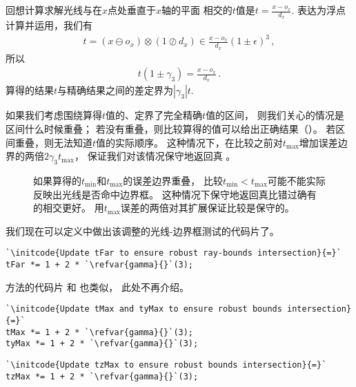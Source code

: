 回想计算求解光线与在$x$点处垂直于$x$轴的平面
相交的$t$值是$\displaystyle t=\frac{x-o_x}{d_x}$.
表达为浮点计算并运用，我们有
\begin{align*}
    t=(x\ominus o_x)\otimes(1\oslash d_x)\in\frac{x-o_x}{d_x}(1\pm\epsilon)^3\, ,
\end{align*}
所以
\begin{align*}
    t(1\pm\gamma_3)=\frac{x-o_x}{d_x}\, .
\end{align*}
算得的结果$t$与精确结果之间的差定界为$|\gamma_3|t$.

如果我们考虑围绕算得$t$值的、定界了完全精确$t$值的区间，
则我们关心的情况是区间什么时候重叠；
若没有重叠，则比较算得的值可以给出正确结果（）。
若区间重叠，则无法知道$t$值的实际顺序。
这种情况下，在比较之前对$t_{\max}$增加误差边界的两倍$2\gamma_3t_{\max}$，
保证我们对该情况保守地返回真
。
\begin{figure}[htbp]
    \centering
    \caption{如果算得的$t_{\min}$和$t_{\max}$的误差边界重叠，
    比较$t_{\min}<t_{\max}$可能不能实际反映出光线是否命中边界框。
    这种情况下保守地返回真比错过确有的相交更好。
    用$t_{\max}$误差的两倍对其扩展保证比较是保守的。}
    \label{fig:3.42}
\end{figure}

我们现在可以定义中做出该调整的光线-边界框测试的代码片了。
\begin{lstlisting}
`\initcode{Update tFar to ensure robust ray-bounds intersection}{=}`
tFar *= 1 + 2 * `\refvar{gamma}{}`(3);
\end{lstlisting}

方法的代码片
和
也类似，
此处不再介绍。
\begin{lstlisting}
`\initcode{Update tMax and tyMax to ensure robust bounds intersection}{=}`
tMax *= 1 + 2 * `\refvar{gamma}{}`(3);
tyMax *= 1 + 2 * `\refvar{gamma}{}`(3);
\end{lstlisting}
\begin{lstlisting}
`\initcode{Update tzMax to ensure robust bounds intersection}{=}`
tzMax *= 1 + 2 * `\refvar{gamma}{}`(3);
\end{lstlisting}

